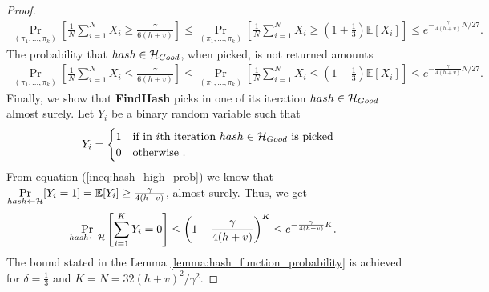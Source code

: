 \begin{proof}
\begin{align*}
  \underset{(\pi_1, \dots, \pi_k)}{\Pr} \left[\frac{1}{N} \sum_{i=1}^{N} X_i \geq \frac{\gamma}{6(h+v)} \right] \leq
  \underset{(\pi_1, \dots, \pi_k)}{\Pr}\left[\frac{1}{N} \sum_{i=1}^{N} X_i \geq (1 + \frac{1}{3}) \mathbb{E}[X_i]\right] \leq
  e^{-{\frac{\gamma}{4(h+v)}} N /27}.
\end{align*}
%
The probability that $hash \in \mathcal{H}_{Good}$, when picked, is not returned amounts
\begin{align*}
  \underset{(\pi_1, \dots, \pi_k)}{\Pr}\left[\frac{1}{N} \sum_{i=1}^{N} X_i \leq \frac{\gamma}{6(h+v)}\right] \leq
  \underset{(\pi_1, \dots, \pi_k)}{\Pr}\left[\frac{1}{N} \sum_{i=1}^{N} X_i \leq (1 - \frac{1}{3})\mathbb{E}[X_i]\right] \leq e^{-{\frac{\gamma}{4(h+v)}} N /27}.
\end{align*}
%
Finally, we show that \textbf{FindHash} picks in one of its iteration $hash \in \mathcal{H}_{Good}$ almost surely.
Let $Y_i$ be a binary random variable such that
\begin{align*}
  Y_i =
  \begin{cases}
    1 & \text{if in $i$th iteration $hash \in \mathcal{H}_{Good}$ is picked} \\
    0 & \text{otherwise .}
  \end{cases}
\end{align*}
From equation (\ref{ineq:hash_high_prob}) we know that $\underset{hash \leftarrow \mathcal{H}}{\Pr}[Y_i = 1] = \mathbb{E}[Y_i] \geq \frac{\gamma}{4(h+v)}$, almost surely.
Thus, we get
\begin{align*}
  \underset{hash \leftarrow \mathcal{H}}{\Pr}\left[\sum_{i=1}^{K} Y_i = 0\right] &\leq \left(1 - \frac{\gamma}{4(h+v)}\right)^{K} \leq e^{-\frac{\gamma}{4(h+v)} K}.
\end{align*}
The bound stated in the Lemma \ref{lemma:hash_function_probability} is achieved for $\delta = \frac{1}{3}$ and $K = N = 32(h+v)^2/\gamma^2$.
\end{proof}
